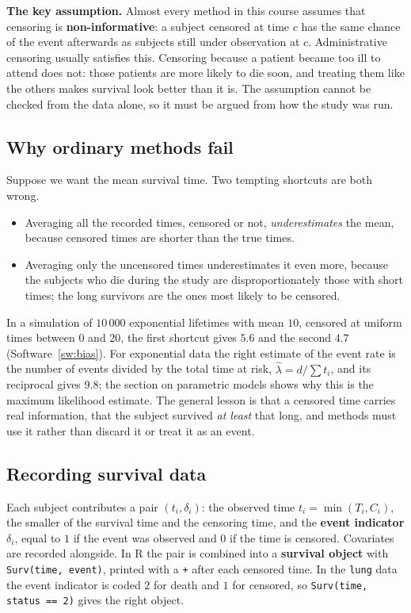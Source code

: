 \documentclass[11pt,a4paper]{article}
\numberwithin{equation}{section}
\theoremstyle{definition}
\begin{document}
\textbf{The key assumption.} Almost every method in this course assumes that censoring is \textbf{non-informative}: a subject censored at time $c$ has the same chance of the event afterwards as subjects still under observation at $c$. Administrative censoring usually satisfies this. Censoring because a patient became too ill to attend does not: those patients are more likely
to die soon, and treating them like the others makes survival look better than it is. The assumption cannot be checked from the data alone, so it must be argued from how the study was run.

\subsection{Why ordinary methods fail}
\label{ssec:whyspecial}

Suppose we want the mean survival time. Two tempting shortcuts are both wrong.
\begin{itemize}
\item Averaging all the recorded times, censored or not, \emph{underestimates} the mean, because censored times are shorter than the true times.
\item Averaging only the uncensored times underestimates it even more, because the subjects who die during the study are disproportionately those with short times; the long survivors are the ones most likely to be censored.
\end{itemize}
In a simulation of $10\,000$ exponential lifetimes with mean $10$, censored at uniform times between $0$ and $20$, the first shortcut gives $5.6$ and the second $4.7$ (Software~\ref{sw:bias}). For exponential data the right estimate of the event rate is the number of events divided by the total time at risk, $\hat\lambda = d/\sum t_i$, and its reciprocal gives
$9.8$; the section on parametric models shows why this is the maximum likelihood estimate. The general lesson is that a censored time carries real information, that the subject survived \emph{at least} that long, and methods must use it rather than discard it or treat it as an event.

\subsection{Recording survival data}
\label{ssec:recording}

Each subject contributes a pair $(t_i, \delta_i)$: the observed time $t_i = \min(T_i, C_i)$, the smaller of the survival time and the censoring time, and the \textbf{event indicator} $\delta_i$, equal to $1$ if the event was observed and $0$ if the time is censored. Covariates are recorded alongside. In R the pair is combined into a \textbf{survival object} with \texttt{Surv(time, event)}, printed with a
\texttt{+} after each censored time. In the \texttt{lung} data the event indicator is coded $2$ for death and $1$ for censored, so \texttt{Surv(time, status == 2)} gives the right object.
\end{document}
